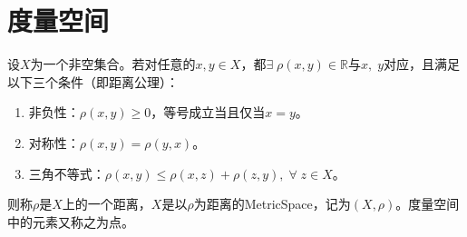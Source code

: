 \chapter{度量空间}

\begin{definition}
	设$X$为一个非空集合。若对任意的$x,y\in X$，都$\exists\;\rho(x,y)\in\mathbb{R}$与$x,\;y$对应，且满足以下三个条件（即距离公理）：
	\begin{enumerate}
		\item 非负性：$\rho(x,y)\geqslant0$，等号成立当且仅当$x=y$。
		\item 对称性：$\rho(x,y)=\rho(y,x)$。
		\item 三角不等式：$\rho(x,y)\leqslant\rho(x,z)+\rho(z,y),\;\forall\;z\in X$。
	\end{enumerate}
	则称$\rho$是$X$上的一个距离，$X$是以$\rho$为距离的\gls{MetricSpace}，记为$(X,\rho)$。度量空间中的元素又称之为点。
\end{definition}











